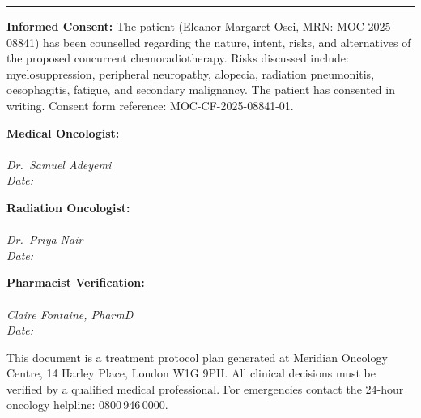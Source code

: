 \documentclass[11pt,a4paper]{scrartcl}
\newcommand{\sectionrule}{%
  \par\vspace{2pt}\noindent%
  {\color{TealAccent}\rule{\linewidth}{1.5pt}}\par\par%
  \vspace{4pt}%
}
\newcommand{\field}[1]{\underline{\hspace{#1}}}
\begin{document}
\par
\vspace{5mm}


\sectionrule

\begin{tcolorbox}[
  enhanced,
  colback=WarmSand,
  colframe=NavyDeep,
  arc=3pt,
  boxrule=0.8pt,
  top=6pt, bottom=6pt, left=8pt, right=8pt
]
\footnotesize

\noindent\textbf{\textcolor{NavyDeep}{Informed Consent:}} The patient (Eleanor Margaret Osei, MRN: MOC-2025-08841) has been counselled
regarding the nature, intent, risks, and alternatives of the proposed concurrent chemoradiotherapy.
Risks discussed include: myelosuppression, peripheral neuropathy, alopecia, radiation pneumonitis,
oesophagitis, fatigue, and secondary malignancy. The patient has consented in writing. Consent form
reference: MOC-CF-2025-08841-01.

\vspace{6pt}

\noindent
\begin{minipage}[t]{0.30\linewidth}
  \footnotesize
  \textbf{Medical Oncologist:}\\[10pt]
  \field{5cm}\\
  \textit{Dr.\ Samuel Adeyemi}\\
  \textit{Date: \field{2cm}}
\end{minipage}%
\hspace{3mm}
\begin{minipage}[t]{0.30\linewidth}
  \footnotesize
  \textbf{Radiation Oncologist:}\\[10pt]
  \field{5cm}\\
  \textit{Dr.\ Priya Nair}\\
  \textit{Date: \field{2cm}}
\end{minipage}%
\hspace{3mm}
\begin{minipage}[t]{0.30\linewidth}
  \footnotesize
  \textbf{Pharmacist Verification:}\\[10pt]
  \field{5cm}\\
  \textit{Claire Fontaine, PharmD}\\
  \textit{Date: \field{2cm}}
\end{minipage}

\vspace{6pt}
\noindent\textcolor{TextMuted}{\tiny This document is a treatment protocol plan generated at Meridian Oncology Centre, 14 Harley Place, London W1G 9PH.
All clinical decisions must be verified by a qualified medical professional. For emergencies contact the 24-hour oncology helpline: 0800\,946\,0000.}

\end{tcolorbox}
\end{document}
